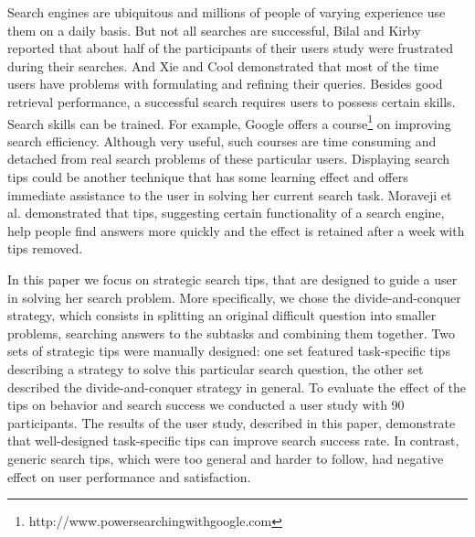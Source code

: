 \documentclass{sig-alternate}
\begin{document}
Search engines are ubiquitous and millions of people of varying experience use them on a daily basis.
But not all searches are successful, Bilal and Kirby \cite{Bilal:2002:DSI:637512.637516} reported that about half of the participants of their users study were frustrated during their searches.
And Xie and Cool \cite{xie2009understanding} demonstrated that most of the time users have problems with formulating and refining their queries.
Besides good retrieval performance, a successful search requires users to possess certain skills.
Search skills can be trained. For example, Google offers a course\footnote{http://www.powersearchingwithgoogle.com} on improving search efficiency.
Although very useful, such courses are time consuming and detached from real search problems of these particular users. 
Displaying search tips could be another technique that has some learning effect and offers immediate assistance to the user in solving her current search task.
Moraveji et al. \cite{Moraveji:2011:MIU:2009916.2009966} demonstrated that tips, suggesting certain functionality of a search engine, help people find answers more quickly and the effect is retained after a week with tips removed.

In this paper we focus on strategic search tips, that are designed to guide a user in solving her search problem.
More specifically, we chose the divide-and-conquer strategy, which consists in splitting an original difficult question into smaller problems, searching answers to the subtasks and combining them together.
Two sets of strategic tips were manually designed: one set featured task-specific tips describing a strategy to solve this particular search question, the other set described the divide-and-conquer strategy in general.
To evaluate the effect of the tips on behavior and search success we conducted a user study with 90 participants.
The results of the user study, described in this paper, demonstrate that well-designed task-specific tips can improve search success rate.
In contrast, generic search tips, which were too general and harder to follow, had negative effect on user performance and satisfaction.
\end{document}
